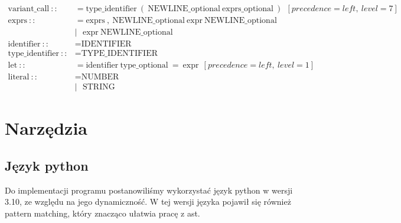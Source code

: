 \documentclass{article}
\begin{document}
\begin{align*}
  \text{variant\_call}\ ::            & = \text{type\_identifier}\ (\ \text{NEWLINE\_optional}\ \text{exprs\_optional}\ )\ \ [precedence=left,\ level=7]                                                                                                          \\
  \text{exprs}\ ::                    & = \text{exprs}\ ,\ \text{NEWLINE\_optional}\ \text{expr}\ \text{NEWLINE\_optional}                                                                                                                                        \\
                                      & |\ \ \ \text{expr}\ \text{NEWLINE\_optional}                                                                                                                                                                              \\
  \text{identifier}\ ::               & = \text{IDENTIFIER}                                                                                                                                                                                                       \\
  \text{type\_identifier}\ ::         & = \text{TYPE\_IDENTIFIER}                                                                                                                                                                                                 \\
  \text{let}\ ::                      & = \text{identifier}\ \text{type\_optional}\ =\ \text{expr}\ \ [precedence=left,\ level=1]                                                                                                                                 \\
  \text{literal}\ ::                  & = \text{NUMBER}                                                                                                                                                                                                           \\
                                      & |\ \ \ \text{STRING}
\end{align*}
\section{Narzędzia}
\subsection{Język python}
Do implementacji programu postanowiliśmy wykorzystać język python w wersji 3.10, ze względu na jego dynamiczność.
W tej wersji języka pojawił się również pattern matching, który znacząco ułatwia pracę z ast.
\end{document}

